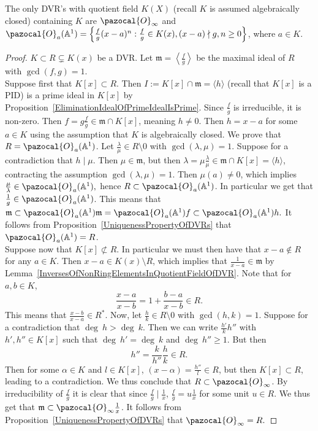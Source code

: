 \begin{proposition}\label{ClassifyingOneVariableDVRs}
    The only DVR's with quotient field $K(X)$ (recall $K$ is assumed algebraically closed) containing $K$ are $\pazocal{O}_\infty$ and $\pazocal{O}_a(\A^1)=\left\{\frac{f}{g}(x-a)^n: \frac{f}{g}\in K(x), (x-a)\nmid g, n\geq 0\right\}$, where $a\in K$. 
\end{proposition}
\begin{proof}
    $K\subset R\subsetneq K(x)$ be a DVR. Let $\mathfrak{m}=\left\langle\frac{f}{g}\right\rangle$ be the maximal ideal of $R$ with $\gcd(f,g)=1$.\\
    Suppose first that $K[x]\subset R$. Then $I:=K[x]\cap \mathfrak{m}=\langle h\rangle$ (recall that $K[x]$ is a PID) is a prime ideal in $K[x]$ by Proposition~\ref{EliminationIdealOfPrimeIdealIsPrime}. Since $\frac{f}{g}$ is irreducible, it is non-zero. Then $f=g\frac{f}{g}\in \mathfrak{m}\cap K[x]$, meaning $h\neq 0$. Then $h = x-a$ for some $a\in K$ using the assumption that $K$ is algebraically closed. We prove that $R=\pazocal{O}_a(\A^1)$. Let $\frac{\lambda}{\mu}\in R\setminus 0$ with $\gcd(\lambda,\mu)=1$. Suppose for a contradiction that $h\mid \mu$. Then $\mu \in \mathfrak{m}$, but then $\lambda = \mu\frac{\lambda}{\mu} \in \mathfrak{m}\cap K[x] = \langle h\rangle$, contracting the assumption $\gcd(\lambda,\mu)=1$. Then $\mu(a)\neq0$, which implies $\frac{\mu}{\lambda}\in\pazocal{O}_a(\A^1),$ hence $R\subset \pazocal{O}_a(\A^1)$. In particular we get that $\frac{1}{g}\in \pazocal{O}_a(\A^1)$. This means that $\mathfrak{m}\subset \pazocal{O}_a(\A^1)\mathfrak{m} = \pazocal{O}_a(\A^1)f \subset \pazocal{O}_a(\A^1)h.$ It follows from Proposition~\ref{UniquenessPropertyOfDVRs} that $\pazocal{O}_a(\A^1)=R$.\\
    Suppose now that $K[x]\not\subset R$. In particular we must then have that $x-a\notin R$ for any $a\in K$. Then $x-a\in K(x)\setminus R$, which implies that $\frac{1}{x-a}\in \mathfrak{m}$ by Lemma~\ref{InversesOfNonRingElementsInQuotientFieldOfDVR}. Note that for $a,b\in K$,
    $$\frac{x-a}{x-b}=1+\frac{b-a}{x-b}\in R.$$
    This means that $\frac{x-b}{x-a}\in R^\ast$. Now, let $\frac{h}{k}\in R\setminus 0$ with $\gcd(h,k)=1$. Suppose for a contradiction that $\deg\ h> \deg \ k$. Then we can write $\frac{h'}{k}h''$ with $h',h''\in K[x]$ such that $\deg\ h' = \deg \ k$ and $\deg\ h''\geq 1$. But then 
    $$h'' = \frac{k}{h''} \frac{h}{k}\in R.$$ Then for some $\alpha\in K$ and $l\in K[x]$, $(x-\alpha)=\frac{h''}{l}\in R$, but then $K[x]\subset R$, leading to a contradiction. We thus conclude that $R\subset\pazocal{O}_\infty$. By irreducibility of $\frac{f}{g}$ it is clear that since $\frac{f}{g}\mid \frac{1}{x}$, $\frac{f}{g}=u\frac{1}{x}$ for some unit $u\in R$. We thus get that $\mathfrak{m}\subset \pazocal{O}_\infty\frac{1}{x}$. It follows from Proposition~\ref{UniquenessPropertyOfDVRs} that $\pazocal{O}_\infty=R.$ 
\end{proof}

